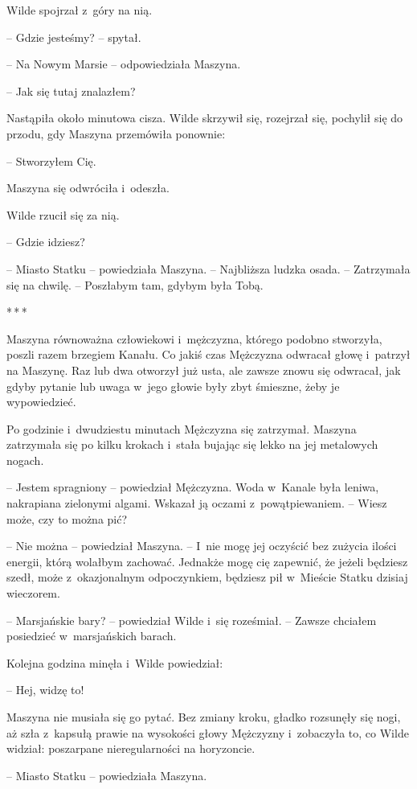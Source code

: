 \documentclass[oneside,polish,11pt,sfheadings]{mwbk}
\newcommand{\threeast}{\bigskip\par\centerline{*\,*\,*}\medskip\par}
\begin{document}
Wilde spojrzał z~góry na nią.

-- Gdzie jesteśmy? -- spytał.

-- Na Nowym Marsie -- odpowiedziała Maszyna.

-- Jak się tutaj znalazłem?

Nastąpiła około minutowa cisza. Wilde skrzywił się, rozejrzał się,
pochylił się do przodu, gdy Maszyna przemówiła ponownie:

-- Stworzyłem Cię.

Maszyna się odwróciła i~odeszła.

Wilde rzucił się za nią.

-- Gdzie idziesz?

-- Miasto Statku -- powiedziała Maszyna. -- Najbliższa ludzka osada. -- Zatrzymała się na chwilę. -- Poszłabym tam, gdybym była Tobą.

\threeast

Maszyna równoważna człowiekowi i~mężczyzna, którego podobno stworzyła,
poszli razem brzegiem Kanału. Co jakiś czas Mężczyzna odwracał głowę i~patrzył na Maszynę. Raz lub dwa otworzył już usta, ale zawsze znowu się
odwracał, jak gdyby pytanie lub uwaga w~jego głowie były zbyt śmieszne,
żeby je wypowiedzieć.

Po godzinie i~dwudziestu minutach Mężczyzna się zatrzymał. Maszyna
zatrzymała się po kilku krokach i~stała bujając się lekko na jej
metalowych nogach.

-- Jestem spragniony -- powiedział Mężczyzna. Woda w~Kanale była leniwa,
nakrapiana zielonymi algami. Wskazał ją oczami z~powątpiewaniem. -- Wiesz
może, czy to można pić?

-- Nie można -- powiedział Maszyna. -- I~nie mogę jej oczyścić bez zużycia
ilości energii, którą wolałbym zachować. Jednakże mogę cię zapewnić, że
jeżeli będziesz szedł, może z~okazjonalnym odpoczynkiem, będziesz pił w~Mieście Statku dzisiaj wieczorem.

-- Marsjańskie bary? -- powiedział Wilde i~się roześmiał. -- Zawsze
chciałem posiedzieć w~marsjańskich barach.

Kolejna godzina minęła i~Wilde powiedział: 

-- Hej, widzę to!

Maszyna nie musiała się go pytać. Bez zmiany kroku, gładko rozsunęły się
nogi, aż szła z~kapsułą prawie na wysokości głowy Mężczyzny i~zobaczyła
to, co Wilde widział: poszarpane nieregularności na horyzoncie.

-- Miasto Statku -- powiedziała Maszyna.
\end{document}
